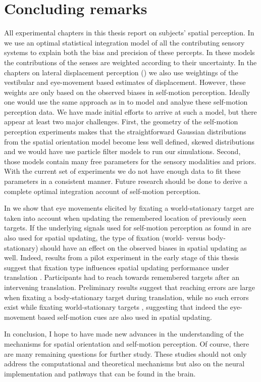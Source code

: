 \section{Concluding remarks}

All experimental chapters in this thesis report on subjects' spatial perception. In  we use an optimal statistical integration model of all the contributing sensory systems to explain both the bias and precision of these percepts. In these models the contributions of the senses are weighted according to their uncertainty. In the chapters on lateral displacement perception () we also use weightings of the vestibular and eye-movement based estimates of displacement. However, these weights are only based on the observed biases in self-motion perception. Ideally one would use the same approach as in  to model and analyse these self-motion perception data. We have made initial efforts to arrive at such a model, but there appear at least two major challenges. First, the geometry of the self-motion perception experiments makes that the straightforward Gaussian distributions from the spatial orientation model become less well defined, skewed distributions and we would have use particle filter models to run our simulations. Second, those models contain many free parameters for the sensory modalities and priors. With the current set of experiments we do not have enough data to fit these parameters in a consistent manner. Future research should be done to derive a complete optimal integration account of self-motion perception.

In  we show that eye movements elicited by fixating a world-stationary target are taken into account when updating the remembered location of previously seen targets.  If the underlying signals used for self-motion perception as found in  are also used for spatial updating, the type of fixation (world- versus body-stationary) should have an effect on the observed biases in spatial updating as well. Indeed, results from a pilot experiment in the early stage of this thesis suggest that fixation type influences spatial updating performance under translation \cite{clemens2010}. Participants had to reach towards remembered targets after an intervening translation. Preliminary results suggest that reaching errors are large when fixating a body-stationary target during translation, while no such errors exist while fixating world-stationary targets \cite{clemens2010}, suggesting that indeed the eye-movement based self-motion cues are also used in spatial updating.

In conclusion, I hope to have made new advances in the understanding of the mechanisms for spatial orientation and self-motion perception. Of course, there are many remaining questions for further study. These studies should not only address the computational and theoretical mechanisms but also on the neural implementation and pathways that can be found in the brain.

 